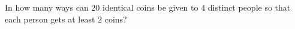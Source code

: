 In how many ways can $20$ identical coins be given to $4$ distinct people so that each person gets at least $2$ coins?
